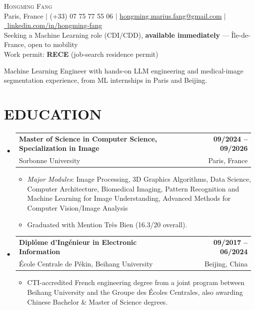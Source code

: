 \documentclass[a4paper,11pt]{article}
\makeatletter
\let\oldsection\section
\renewcommand{\section}[1]{\needspace{5\baselineskip}\oldsection{#1}}
\newcommand{\resumeItem}[1]{
  \item\small{
    {#1\vspace{-1pt}}
  }
}
\newcommand{\resumeSubheading}[4]{
  \vspace{-2pt plus 12pt}\item
    \begin{tabular*}{1.0\textwidth}[t]{l@{\extracolsep{\fill}}r}
      \textbf{#1} & \textbf{#2} \\
      {#3} & \textnormal{#4} \\
    \end{tabular*}\vspace{-7pt}\nopagebreak[4]
}
\newcommand{\resumeSubHeadingListStart}{\begin{itemize}[leftmargin=0.0in, label={}]}
\newcommand{\resumeSubHeadingListEnd}{\end{itemize}}
\newcommand{\resumeItemListStart}{\begin{itemize}}
\newcommand{\resumeItemListEnd}{\end{itemize}\vspace{-5pt}}
\makeatother
\begin{document}
\vspace*{-0.2in}
\begin{center}
    {\LARGE \scshape Hongming Fang} \\[2pt]
    \small Paris, France $|$ (+33) 07 75 77 55 06 $|$
    \href{mailto:hongming.marius.fang@gmail.com}{hongming.marius.fang@gmail.com} $|$
    \href{https://linkedin.com/in/hongming-fang}{\raisebox{-0.2\height}\faLinkedin\ linkedin.com/in/hongming-fang} \\
    {Seeking a Machine Learning role (CDI/CDD), \textbf{available immediately} — Île-de-France, open to mobility} \\
    {Work permit: \textbf{RECE} (job-search residence permit)}
    \vspace{-5pt}
\end{center}

\noindent\small{Machine Learning Engineer with hands-on LLM engineering and medical-image segmentation experience, from ML internships in Paris and Beijing.}\par
\vspace{-4pt}
\vspace{6pt}

\section{EDUCATION}
  \resumeSubHeadingListStart
    \resumeSubheading
    {Master of Science in Computer Science, Specialization in Image}{09/2024 -- 09/2026}
    {Sorbonne University}{Paris, France}
    \resumeItemListStart
     \resumeItem{\textit{Major Modules}: Image Processing, 3D Graphics Algorithms, Data Science, Computer Architecture, Biomedical Imaging, Pattern Recognition and Machine Learning for Image Understanding, Advanced Methods for Computer Vision/Image Analysis}
     \resumeItem{Graduated with Mention Très Bien (16.3/20 overall).}
    \resumeItemListEnd

    \resumeSubheading
      {Diplôme d'Ingénieur in Electronic Information}{09/2017 -- 06/2024}
      {École Centrale de Pékin, Beihang University}{Beijing, China}
    \resumeItemListStart
        \resumeItem{CTI-accredited French engineering degree from a joint program between Beihang University and the Groupe des Écoles Centrales, also awarding Chinese Bachelor \& Master of Science degrees.}
    \resumeItemListEnd
  \resumeSubHeadingListEnd

\end{document}
